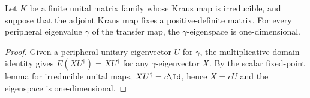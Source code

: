\begin{theorem}
    \label{thm:peripheral_multiplicity_one}
    \leanok
    Let $K$ be a finite unital matrix family whose Kraus map is irreducible,
    and suppose that the adjoint Kraus map fixes a positive-definite matrix.
    For every peripheral eigenvalue $\gamma$ of the transfer map, the
    $\gamma$-eigenspace is one-dimensional.
\end{theorem}

\begin{proof}\leanok
    Given a peripheral unitary eigenvector $U$ for $\gamma$, the
    multiplicative-domain identity gives
    $E(XU^\dagger)=XU^\dagger$ for any $\gamma$-eigenvector $X$.
    By the scalar fixed-point lemma for irreducible unital maps,
    $XU^\dagger=c\Id$, hence $X=cU$ and the eigenspace is one-dimensional.
\end{proof}
